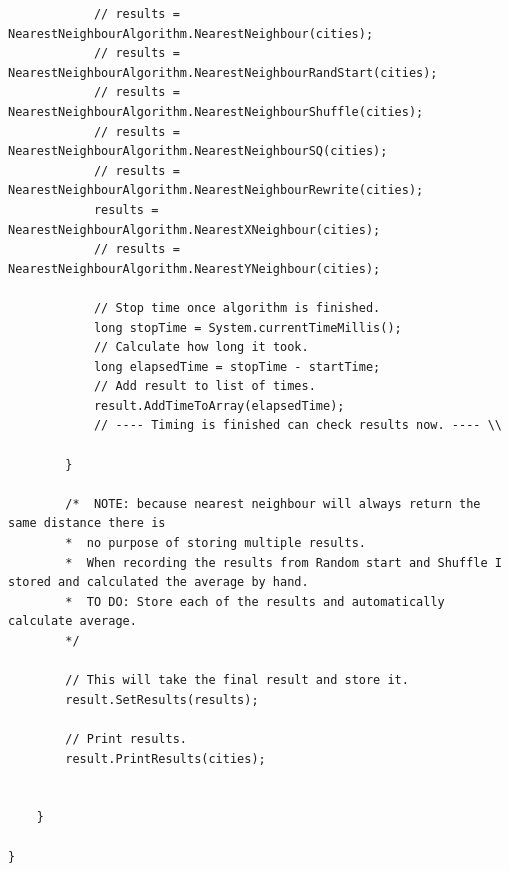 \documentclass[conference,backref=page]{acmsiggraph}
\begin{document}
\begin{verbatim}
			// results = NearestNeighbourAlgorithm.NearestNeighbour(cities);
			// results = NearestNeighbourAlgorithm.NearestNeighbourRandStart(cities);
			// results = NearestNeighbourAlgorithm.NearestNeighbourShuffle(cities);
			// results = NearestNeighbourAlgorithm.NearestNeighbourSQ(cities);
			// results = NearestNeighbourAlgorithm.NearestNeighbourRewrite(cities);
			results = NearestNeighbourAlgorithm.NearestXNeighbour(cities);
			// results = NearestNeighbourAlgorithm.NearestYNeighbour(cities);
			
			// Stop time once algorithm is finished.
			long stopTime = System.currentTimeMillis();
			// Calculate how long it took.
			long elapsedTime = stopTime - startTime;
			// Add result to list of times.
			result.AddTimeToArray(elapsedTime);
			// ---- Timing is finished can check results now. ---- \\
			
		}
		
		/*	NOTE: because nearest neighbour will always return the same distance there is
		*  no purpose of storing multiple results. 
		*  When recording the results from Random start and Shuffle I stored and calculated the average by hand.
		*  TO DO: Store each of the results and automatically calculate average.
		*/
		
		// This will take the final result and store it.
		result.SetResults(results);
		
		// Print results.
		result.PrintResults(cities);
		
		
	}
	
}

\end{verbatim}


\end{document}
